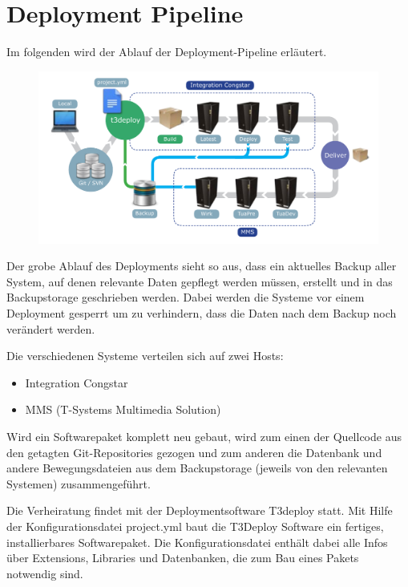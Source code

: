\documentclass[11pt,a4paper]{article} %
\begin{document}
\section{Deployment Pipeline} \label{sec:pipeline}

Im folgenden wird der Ablauf der Deployment-Pipeline erläutert. 
\begin{figure}[h]
\includegraphics[width=\textwidth]{images/DeploymentPipeline.pdf}
\centering
\end{figure}
 
Der grobe Ablauf des Deployments sieht so aus, dass ein aktuelles Backup aller System, auf denen relevante Daten gepflegt werden müssen, erstellt und in das Backupstorage geschrieben werden. Dabei werden die Systeme vor einem Deployment gesperrt um zu verhindern, dass die Daten nach dem Backup noch verändert werden. 


Die verschiedenen Systeme verteilen sich auf zwei Hosts:

\begin{itemize}
  \item Integration Congstar
  \item MMS (T-Systems Multimedia Solution)
\end{itemize}

Wird ein Softwarepaket komplett neu gebaut, wird zum einen der Quellcode aus den getagten Git-Repositories gezogen und zum anderen die Datenbank und andere Bewegungsdateien aus dem Backupstorage (jeweils von den relevanten Systemen) zusammengeführt. 

Die Verheiratung findet mit der Deploymentsoftware T3deploy statt. Mit Hilfe der Konfigurationsdatei project.yml baut die T3Deploy Software ein fertiges, installierbares Softwarepaket. Die Konfigurationsdatei 
enthält dabei alle Infos über Extensions, Libraries und Datenbanken, die zum Bau eines Pakets notwendig sind.
\end{document}
